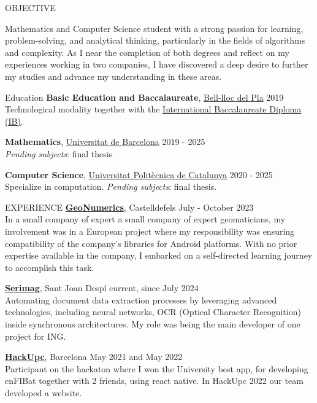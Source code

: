 \documentclass{resume} %
\begin{document}
\begin{rSection}{OBJECTIVE}

 Mathematics and Computer Science student with a strong passion for learning, problem-solving, and analytical thinking, particularly in the fields of algorithms and complexity. As I near the completion of both degrees and reflect on my experiences working in two companies, I have discovered a deep desire to further my studies and advance my understanding in these areas.

\end{rSection}


\begin{rSection}{Education}
 {\bf Basic Education and Baccalaureate}, \href{https://www.bell-lloc.org/en/}{Bell-lloc del Pla} \hfill {2019}\\
 Technological modality together with the \href{https://www.ibo.org/}{International Baccalaureate Diploma (IB)}.

 {\bf Mathematics}, \href{https://web.ub.edu/en/home}{Universitat de Barcelona} \hfill {2019 - 2025}\\
 \textit{Pending subjects}: final thesis 

 {\bf Computer Science}, \href{https://www.upc.edu/en?set_language=en}{Universitat Politècnica de Catalunya} \hfill {2020 - 2025}\\
 Specialize in computation. \textit{Pending subjects}: final thesis.
\end{rSection}

\begin{rSection}{EXPERIENCE}
 {\bf \href{https://www.geonumerics.es/}{GeoNumerics}}, Castelldefels \hfill {July - October 2023} \\
 In a small company of expert a small company of expert geomaticians,  my involvement was in a European project where my responsibility was ensuring compatibility of the company’s libraries for Android platforms. With no prior expertise available in the company, I embarked on a self-directed learning journey to accomplish this task.

 {\bf \href{https://serimag.com/en/}{Serimag}}, Sant Joan Despí \hfill {current, since July 2024} \\
 Automating document data extraction processes by leveraging advanced technologies, including neural networks, OCR (Optical Character Recognition) inside synchronous architectures. My role was being the main developer of one project for ING.

\textbf{\href{https://hackupc.com/}{HackUpc}}, Barcelona \hfill  May 2021 and May 2022 \\
 Participant on the hackaton where I won the University best app, for developing enFIBat together with 2 friends, using react native. In HackUpc 2022 our team developed a website.
\end{rSection}
\end{document}
